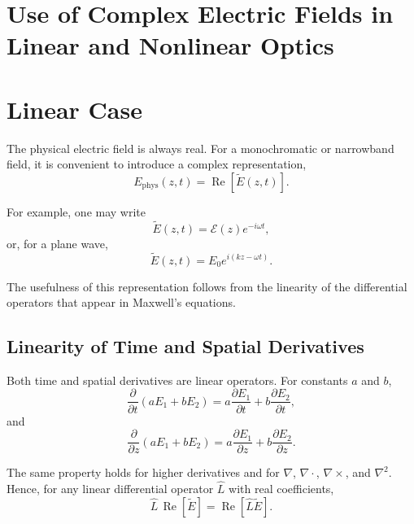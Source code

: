 \documentclass[11pt]{article}
\begin{document}
\section*{Use of Complex Electric Fields in Linear and Nonlinear Optics}

\section{Linear Case}

The physical electric field is always real.  For a monochromatic or narrowband field, it is convenient to introduce a complex representation,
\begin{equation}
E_{\mathrm{phys}}(z,t)
=
\operatorname{Re}\!\left[\tilde{E}(z,t)\right].
\end{equation}

For example, one may write
\begin{equation}
\tilde{E}(z,t)
=
\mathcal{E}(z)e^{-i\omega t},
\end{equation}
or, for a plane wave,
\begin{equation}
\tilde{E}(z,t)
=
E_0 e^{i(kz-\omega t)}.
\end{equation}

The usefulness of this representation follows from the linearity of the differential operators that appear in Maxwell's equations.

\subsection{Linearity of Time and Spatial Derivatives}

Both time and spatial derivatives are linear operators. For constants \(a\) and \(b\),
\begin{equation}
\frac{\partial}{\partial t}(aE_1+bE_2)
=
a\frac{\partial E_1}{\partial t}
+
b\frac{\partial E_2}{\partial t},
\end{equation}
and
\begin{equation}
\frac{\partial}{\partial z}(aE_1+bE_2)
=
a\frac{\partial E_1}{\partial z}
+
b\frac{\partial E_2}{\partial z}.
\end{equation}

The same property holds for higher derivatives and for \(\nabla\), \(\nabla\cdot\), \(\nabla\times\), and \(\nabla^2\). Hence, for any linear differential operator \(\hat{L}\) with real coefficients,
\begin{equation}
\hat{L}\,
\operatorname{Re}\!\left[\tilde{E}\right]
=
\operatorname{Re}\!\left[
\hat{L}\tilde{E}
\right].
\end{equation}
\end{document}
